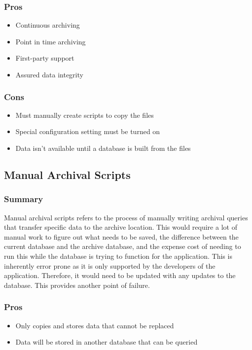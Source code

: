 \documentclass[draftclsnofoot,onecolumn,journal,letterpaper,compsoc,10pt]{IEEEtran}
\begin{document}
        \subsubsection{Pros}
        \begin{itemize}
            \item Continuous archiving
            \item Point in time archiving
            \item First-party support
            \item Assured data integrity
        \end{itemize}
        
        \subsubsection{Cons}
        \begin{itemize}
            \item Must manually create scripts to copy the files
            \item Special configuration setting must be turned on
            \item Data isn't available until a database is built from the files
        \end{itemize}
    
    \subsection{Manual Archival Scripts}
    
        \subsubsection{Summary}
        
        Manual archival scripts refers to the process of manually writing archival queries that transfer specific data to the archive location.  This would require a lot of manual work to figure out what needs to be saved, the difference between the current database and the archive database, and the expense cost of needing to run this while the database is trying to function for the application.  This is inherently error prone as it is only supported by the developers of the application.  Therefore, it would need to be updated with any updates to the database.  This provides another point of failure.
        
        \subsubsection{Pros}
        \begin{itemize}
            \item Only copies and stores data that cannot be replaced
            \item Data will be stored in another database that can be queried
        \end{itemize}
        
\end{document}
